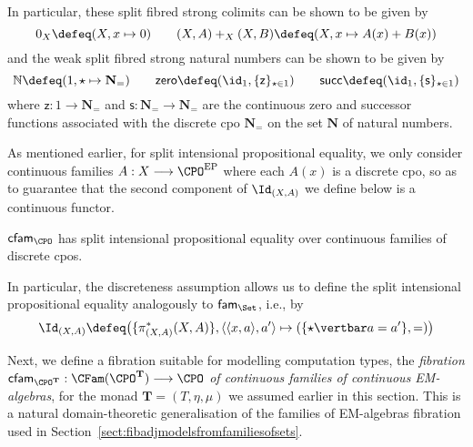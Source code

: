 In particular, these split fibred strong colimits can be shown to be given by
\[
0_X \defeq (X , x \mapsto 0)
\qquad
(X,A) +_X (X,B) \defeq (X , x \mapsto A(x) + B(x))
\]
and the weak split fibred strong natural numbers can be shown to be given by
\[
\mathbb{N} \defeq (1, \star \mapsto \mathbf{N}_=)
\qquad
\mathsf{zero} \defeq (\id_1 , \{\mathsf{z}\}_{\star \in 1})
\qquad
\mathsf{succ} \defeq (\id_1, \{\mathsf{s}\}_{\star \in 1})
\]
where $\mathsf{z} : 1 \longrightarrow \mathbf{N}_=$ and $\mathsf{s} : \mathbf{N}_= \longrightarrow \mathbf{N}_=$ are the continuous zero and successor functions associated with the discrete cpo $\mathbf{N}_=$ on the set $\mathbf{N}$ of natural numbers. 


As mentioned earlier, for split intensional propositional equality, we only consider continuous families $A : X \longrightarrow \CPO^{\text{EP}}$ where each $A(x)$ is a discrete cpo, so as to guarantee that the second component of $\Id_{(X,A)}$ we define below is a continuous functor. 

\begin{proposition}
$\mathsf{cfam}_{\CPO}$ has split intensional propositional equality over continuous families of discrete cpos.
\end{proposition}

In particular, the discreteness assumption allows us to define the split intensional propositional equality analogously to $\mathsf{fam}_{\Set}$, i.e., by
\[
\Id_{(X,A)} \defeq \big(\{\pi^*_{(X,A)}(X,A)\}, \langle \langle x , a \rangle , a' \rangle \mapsto (\{\star \vertbar a = a'\}, =)\big)
\]

Next, we define a fibration suitable for modelling computation types, the \emph{fibration $\mathsf{cfam}_{\CPO^{\mathbf{T}}} : \CFam(\CPO^{\mathbf{T}}) \longrightarrow \CPO$ of continuous families of continuous EM-algebras}, for the monad $\mathbf{T} = (T,\eta,\mu)$ we assumed earlier in this section.
This is a natural domain-theoretic generalisation of the families of EM-algebras fibration used in Section~\ref{sect:fibadjmodelsfromfamiliesofsets}.

